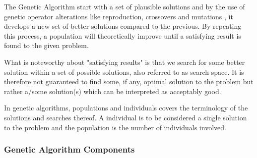 The Genetic Algorithm start with a set of plausible solutions and by the use of genetic operator alterations like reproduction, crossovers and mutations \cite{Baltzer2014}, it develops a new set of better solutions compared to the previous. By repeating this process, a population will theoretically improve until a satisfying result is found to the given problem. \cite{BCS2013}

What is noteworthy about "satisfying results" is that we search for some better solution within a set of possible solutions, also referred to as search space. It is therefore not guaranteed to find some, if any, optimal solution to the problem but rather a/some solution(s) which can be interpreted as acceptably good. \cite[pp. 20/21]{Sivanandam2008}


In genetic algorithms, populations and individuals covers the terminology of the solutions and searches thereof. A individual is to be considered a single solution to the problem and the population is the number of individuals involved. \cite[pp. 39]{Sivanandam2008}



\subsubsection{Genetic Algorithm Components}

